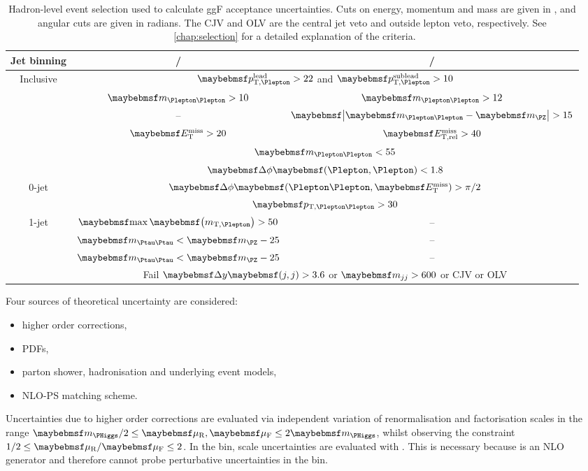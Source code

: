 \begin{table}
	\begin{tabular}{ccc}
		\toprule
		Jet binning & \emch/\mech & \eech/\mmch \\
		\midrule
		Inclusive & \multicolumn{2}{c}{$\ptleadlep > 22$ and $\ptsubleadlep > 10$} \\
		& $\mll > 10$ & $\mll > 12$ \\
		& -- & $\mods{\mll - \mZ} > 15$ \\
		& $\met > 20$ & $\metrel > 40$ \\
		& \multicolumn{2}{c}{$\mll < 55$} \\
		& \multicolumn{2}{c}{$\dphill < 1.8$} \\
		\midrule
		0-jet & \multicolumn{2}{c}{$\dphillmet > \pi/2$} \\
		& \multicolumn{2}{c}{$\ptll > 30$} \\
		\midrule
		1-jet & $\maxmtw > 50$ & -- \\
		& $\mtautau < \mZ - 25$ & -- \\
		\midrule
		\twojet & $\mtautau < \mZ - 25$ & -- \\
		& \multicolumn{2}{c}{Fail $\dyjj > 3.6$ or $\mjj > 600$ or CJV or OLV} \\
		\bottomrule
	\end{tabular}
	\caption{Hadron-level event selection used to calculate ggF acceptance uncertainties. 
	Cuts on energy, momentum and mass are given in \GeV, and angular cuts are given in 
	radians. The CJV and OLV are the central jet veto and outside lepton veto, 
	respectively. See \Chapter~\ref{chap:selection} for a detailed explanation of the 
	criteria.}
	\label{tab:signal:acc_truthselection}
\end{table}

Four sources of theoretical uncertainty are considered:
\begin{itemize}[noitemsep,nolistsep]
	\item higher order corrections,
	\item PDFs,
	\item parton shower, hadronisation and underlying event models,
	\item NLO-PS matching scheme.
\end{itemize}

Uncertainties due to higher order corrections are evaluated via independent variation of 
renormalisation and factorisation scales in the range $\mH/2 \leq \mur,\muf \leq 2\mH$, 
whilst observing the constraint $1/2 \leq \mur/\muf \leq 2$. In the \twojet bin, scale 
uncertainties are evaluated  with \mcfm 
\cite{MCFM:H2j}. This is necessary because \powhegbox is an NLO generator and therefore 
cannot probe perturbative uncertainties in the \twojet bin.


